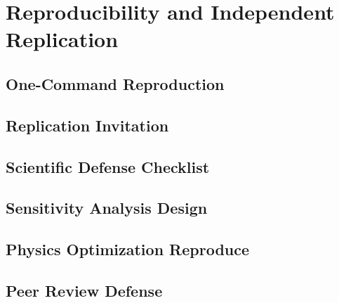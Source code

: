 
\chapter{Reproducibility and Independent Replication}
\label{vol3:chap:repro}


\section{One-Command Reproduction}
\label{vol3:sec:repro:onecommand}



\section{Replication Invitation}
\label{vol3:sec:repro:invite}



\section{Scientific Defense Checklist}
\label{vol3:sec:repro:defense}



\section{Sensitivity Analysis Design}
\label{vol3:sec:repro:sensitivity}



\section{Physics Optimization Reproduce}
\label{vol3:sec:repro:physicsopt}



\section{Peer Review Defense}
\label{vol3:sec:repro:peerdefense}


